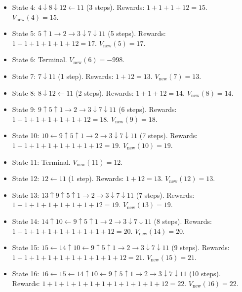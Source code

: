 \documentclass[a3paper,12pt]{extarticle} %
\begin{document}
\begin{enumerate}
\begin{itemize}
\begin{itemize}
            \item State 4: \( 4 \downarrow 8 \downarrow 12 \leftarrow 11 \) (3 steps). Rewards: \( 1 + 1 + 1 + 12 = 15 \). \( V_{\text{new}}(4) = 15 \).
            \item State 5: \( 5 \uparrow 1 \rightarrow 2 \rightarrow 3 \downarrow 7 \downarrow 11 \) (5 steps). Rewards: \( 1 + 1 + 1 + 1 + 1 + 12 = 17 \). \( V_{\text{new}}(5) = 17 \).
            \item State 6: Terminal. \( V_{\text{new}}(6) = -998 \).
            \item State 7: \( 7 \downarrow 11 \) (1 step). Rewards: \( 1 + 12 = 13 \). \( V_{\text{new}}(7) = 13 \).
            \item State 8: \( 8 \downarrow 12 \leftarrow 11 \) (2 steps). Rewards: \( 1 + 1 + 12 = 14 \). \( V_{\text{new}}(8) = 14 \).
            \item State 9: \( 9 \uparrow 5 \uparrow 1 \rightarrow 2 \rightarrow 3 \downarrow 7 \downarrow 11 \) (6 steps). Rewards: \( 1 + 1 + 1 + 1 + 1 + 1 + 12 = 18 \). \( V_{\text{new}}(9) = 18 \).
            \item State 10: \( 10 \leftarrow 9 \uparrow 5 \uparrow 1 \rightarrow 2 \rightarrow 3 \downarrow 7 \downarrow 11 \) (7 steps). Rewards: \( 1 + 1 + 1 + 1 + 1 + 1 + 1 + 12 = 19 \). \( V_{\text{new}}(10) = 19 \).
            \item State 11: Terminal. \( V_{\text{new}}(11) = 12 \).
            \item State 12: \( 12 \leftarrow 11 \) (1 step). Rewards: \( 1 + 12 = 13 \). \( V_{\text{new}}(12) = 13 \).
            \item State 13: \( 13 \uparrow 9 \uparrow 5 \uparrow 1 \rightarrow 2 \rightarrow 3 \downarrow 7 \downarrow 11 \) (7 steps). Rewards: \( 1 + 1 + 1 + 1 + 1 + 1 + 1 + 12 = 19 \). \( V_{\text{new}}(13) = 19 \).
            \item State 14: \( 14 \uparrow 10 \leftarrow 9 \uparrow 5 \uparrow 1 \rightarrow 2 \rightarrow 3 \downarrow 7 \downarrow 11 \) (8 steps). Rewards: \( 1 + 1 + 1 + 1 + 1 + 1 + 1 + 1 + 12 = 20 \). \( V_{\text{new}}(14) = 20 \).
            \item State 15: \( 15 \leftarrow 14 \uparrow 10 \leftarrow 9 \uparrow 5 \uparrow 1 \rightarrow 2 \rightarrow 3 \downarrow 7 \downarrow 11 \) (9 steps). Rewards: \( 1 + 1 + 1 + 1 + 1 + 1 + 1 + 1 + 1 + 12 = 21 \). \( V_{\text{new}}(15) = 21 \).
            \item State 16: \( 16 \leftarrow 15 \leftarrow 14 \uparrow 10 \leftarrow 9 \uparrow 5 \uparrow 1 \rightarrow 2 \rightarrow 3 \downarrow 7 \downarrow 11 \) (10 steps). Rewards: \( 1 + 1 + 1 + 1 + 1 + 1 + 1 + 1 + 1 + 1 + 12 = 22 \). \( V_{\text{new}}(16) = 22 \).

\end{itemize}
\end{itemize}
\end{enumerate}
\end{document}
